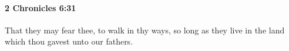 
		\paragraph{2 Chronicles 6:31} %
			\label{2CHRONICLES-6-31}

			That they may fear thee, to walk in thy ways, so long as they live in the land which thou gavest unto our fathers.


